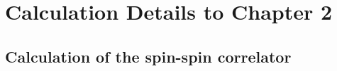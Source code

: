 \chapter{Calculation Details to Chapter 2}

\section{Calculation of the spin-spin correlator} 
\label{app:spinspin}

